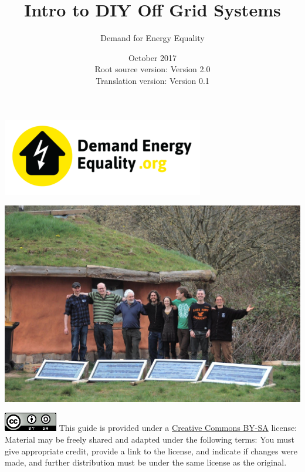 \documentclass{article}
\title{Intro to DIY Off Grid Systems}
\author{Demand for Energy Equality}
\date{October 2017 \\ Root source version: Version 2.0 \\ Translation version: Version 0.1}
\theoremstyle{definition}
\theoremstyle{definition}
\theoremstyle{remark}
\begin{document}
 
\maketitle{}

\begin{center}
  \includegraphics[width=0.25\paperwidth]{../Images/image_0_0_(demand_energy_equality).png}
\end{center}

\begin{center}
  \includegraphics[width=0.65\paperwidth]{../Images/image_0_1_(off_grid).png}
\end{center}

\vfill
  
\includegraphics[]{../Images/image_0_2_(license).png} \newline
This guide is provided under a \href{https://creativecommons.org/licenses/by-sa/4.0/legalcode}{Creative Commons BY-SA} license: \newline
Material may be freely shared and adapted under the following terms: You must give appropriate credit, provide a link to the license, and indicate if changes were made, and further distribution must be under the same license as the original.
\end{document}
